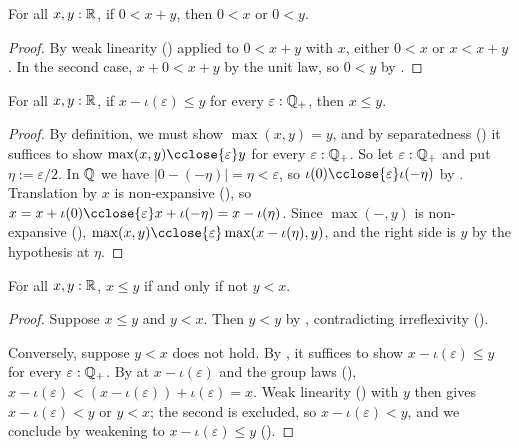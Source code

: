 \begin{lemma}
  \label{posSumPosOrPosReal}
  For all $x, y : \mathbb{R}$, if $0 < x + y$, then $0 < x$ or $0 < y$.
\end{lemma}
\begin{proof}
  By weak linearity () applied to $0 < x + y$ with $x$, either $0 < x$ or $x < x + y$. In the second case, $x + 0 < x + y$ by the unit law, so $0 < y$ by .
\end{proof}

\begin{lemma}
  \label{subRatLeLeReal}
  For all $x, y : \mathbb{R}$, if $x - \iota(\varepsilon) \le y$ for every $\varepsilon : \mathbb{Q}_{+}$, then $x \le y$.
\end{lemma}
\begin{proof}
  By definition, we must show $\max(x, y) = y$, and by separatedness () it suffices to show $\max(x, y) \cclose{\varepsilon} y$ for every $\varepsilon : \mathbb{Q}_{+}$. So let $\varepsilon : \mathbb{Q}_{+}$ and put $\eta := \varepsilon/2$. In $\mathbb{Q}$ we have $\lvert 0 - (-\eta) \rvert = \eta < \varepsilon$, so $\iota(0) \cclose{\varepsilon} \iota(-\eta)$ by . Translation by $x$ is non-expansive (), so $x = x + \iota(0) \cclose{\varepsilon} x + \iota(-\eta) = x - \iota(\eta)$. Since $\max(-, y)$ is non-expansive (), $\max(x, y) \cclose{\varepsilon} \max(x - \iota(\eta), y)$, and the right side is $y$ by the hypothesis at $\eta$.
\end{proof}

\begin{lemma}
  \label{leIffNotGtReal}
  For all $x, y : \mathbb{R}$, $x \le y$ if and only if not $y < x$.
\end{lemma}
\begin{proof}
  Suppose $x \le y$ and $y < x$. Then $y < y$ by , contradicting irreflexivity ().

  Conversely, suppose $y < x$ does not hold. By , it suffices to show $x - \iota(\varepsilon) \le y$ for every $\varepsilon : \mathbb{Q}_{+}$. By  at $x - \iota(\varepsilon)$ and the group laws (), $x - \iota(\varepsilon) < (x - \iota(\varepsilon)) + \iota(\varepsilon) = x$. Weak linearity () with $y$ then gives $x - \iota(\varepsilon) < y$ or $y < x$; the second is excluded, so $x - \iota(\varepsilon) < y$, and we conclude by weakening to $x - \iota(\varepsilon) \le y$ ().
\end{proof}
